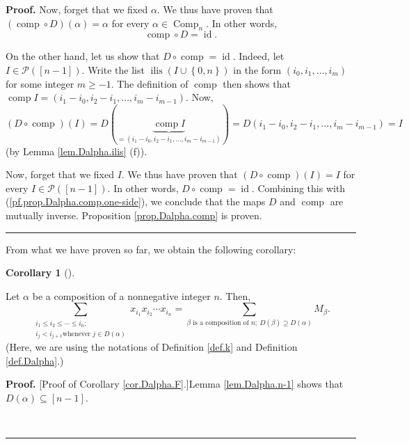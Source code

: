 \documentclass[numbers=enddot,12pt,final,onecolumn,notitlepage,abstracton]{scrartcl}
\theoremstyle{definition}
\newtheorem{coro}[theo]{Corollary}
\newenvironment{corollary}[1][]
{\begin{coro}[#1]\begin{leftbar}}
{\end{leftbar}\end{coro}}
\newenvironment{proof}[1][Proof]{\noindent\textbf{#1.} }{\ \rule{0.5em}{0.5em}}
\let\sumnonlimits\sum
\renewcommand{\sum}{\sumnonlimits\limits}
\newenvironment{verlong}{}{}
\begin{document}
\begin{verlong}
\begin{footnotesize}
\begin{proof}
Now, forget that we fixed $\alpha$. We thus have proven that $\left(
\operatorname*{comp}\circ D\right)  \left(  \alpha\right)  =\alpha$ for every
$\alpha\in\operatorname*{Comp}\nolimits_{n}$. In other words,%
\begin{equation}
\operatorname*{comp}\circ D=\operatorname*{id}.
\label{pf.prop.Dalpha.comp.one-side}%
\end{equation}


On the other hand, let us show that $D\circ\operatorname*{comp}%
=\operatorname*{id}$. Indeed, let $I\in\mathcal{P}\left(  \left[  n-1\right]
\right)  $. Write the list $\operatorname*{ilis}\left(  I\cup\left\{
0,n\right\}  \right)  $ in the form $\left(  i_{0},i_{1},\ldots,i_{m}\right)
$ for some integer $m\geq-1$. The definition of $\operatorname*{comp}$ then
shows that $\operatorname*{comp}I=\left(  i_{1}-i_{0},i_{2}-i_{1},\ldots
,i_{m}-i_{m-1}\right)  $. Now,%
\[
\left(  D\circ\operatorname*{comp}\right)  \left(  I\right)  =D\left(
\underbrace{\operatorname*{comp}I}_{=\left(  i_{1}-i_{0},i_{2}-i_{1}%
,\ldots,i_{m}-i_{m-1}\right)  }\right)  =D\left(  i_{1}-i_{0},i_{2}%
-i_{1},\ldots,i_{m}-i_{m-1}\right)  =I
\]
(by Lemma \ref{lem.Dalpha.ilis} (f)).

Now, forget that we fixed $I$. We thus have proven that $\left(
D\circ\operatorname*{comp}\right)  \left(  I\right)  =I$ for every
$I\in\mathcal{P}\left(  \left[  n-1\right]  \right)  $. In other words,
$D\circ\operatorname*{comp}=\operatorname*{id}$. Combining this with
(\ref{pf.prop.Dalpha.comp.one-side}), we conclude that the maps $D$ and
$\operatorname*{comp}$ are mutually inverse. Proposition
\ref{prop.Dalpha.comp} is proven.
\end{proof}

From what we have proven so far, we obtain the following corollary:

\begin{corollary}
\label{cor.Dalpha.F}Let $\alpha$ be a composition of a nonnegative integer
$n$. Then,
\[
\sum_{\substack{i_{1}\leq i_{2}\leq\cdots\leq i_{n};\\i_{j}<i_{j+1}\text{
whenever }j\in D\left(  \alpha\right)  }}x_{i_{1}}x_{i_{2}}\cdots x_{i_{n}%
}=\sum_{\beta\text{ is a composition of }n;\ D\left(  \beta\right)  \supseteq
D\left(  \alpha\right)  }M_{\beta}.
\]
(Here, we are using the notations of Definition \ref{def.k} and Definition
\ref{def.Dalpha}.)
\end{corollary}

\begin{proof}
[Proof of Corollary \ref{cor.Dalpha.F}.]Lemma \ref{lem.Dalpha.n-1} shows that
$D\left(  \alpha\right)  \subseteq\left[  n-1\right]  $.


\end{proof}
\end{footnotesize}
\end{verlong}
\end{document}
